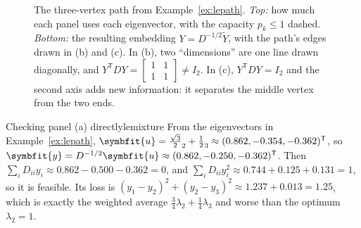 \documentclass[11pt]{article}
\newcommand{\bm}[1]{\symbfit{#1}}
\let\vv\relax\newcommand{\vv}{\bm{v}}
\newcommand{\vu}{\bm{u}}
\newcommand{\T}{^{\mathsf T}}
\begin{document}
\begin{figure}[htbp]
\caption{The three-vertex path from Example~\ref{ex:lepath}. \emph{Top:} how much each panel uses each eigenvector, with the capacity $p_k\le1$ dashed. \emph{Bottom:} the resulting embedding $Y=D^{-1/2}\widetilde Y$, with the path's edges drawn in (b) and (c). In (b), two ``dimensions'' are one line drawn diagonally, and $Y\T DY=\left[\begin{smallmatrix}1&1\\1&1\end{smallmatrix}\right]\ne I_2$. In (c), $Y\T DY=I_2$ and the second axis adds new information: it separates the middle vertex from the two ends.}
\label{fig:capacity}
\end{figure}

\begin{example}{Checking panel (a) directly}{lemixture}
From the eigenvectors in Example~\ref{ex:lepath}, $\vu=\tfrac{\sqrt3}{2}\vv_2+\tfrac12\vv_3\approx(0.862,-0.354,-0.362)\T$, so $\bm y=D^{-1/2}\vu\approx(0.862,-0.250,-0.362)\T$. Then $\sum_iD_{ii}y_i\approx0.862-0.500-0.362=0$, and $\sum_iD_{ii}y_i^2\approx0.744+0.125+0.131=1$, so it is feasible. Its loss is $(y_1-y_2)^2+(y_2-y_3)^2\approx1.237+0.013=1.25$, which is exactly the weighted average $\tfrac34\lambda_2+\tfrac14\lambda_3$ and worse than the optimum $\lambda_2=1$.
\end{example}
\end{document}
